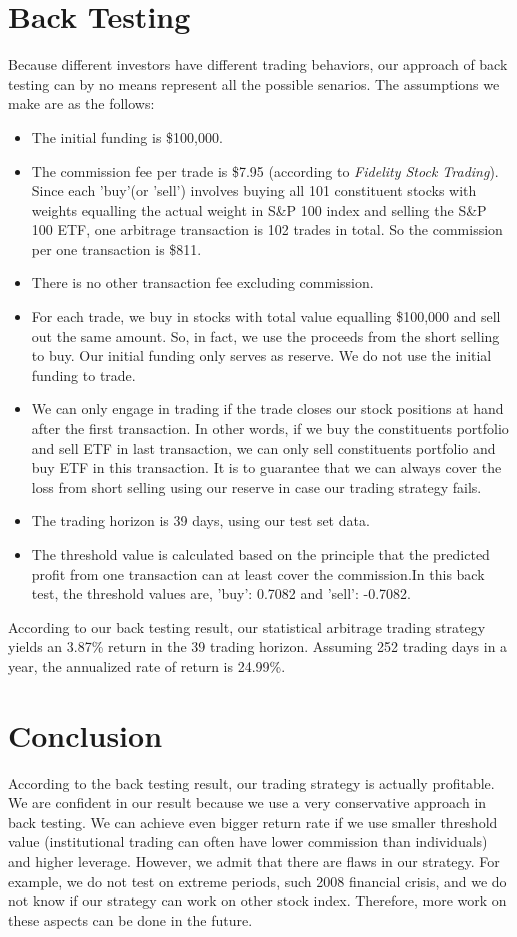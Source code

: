 \documentclass[letterpaper,12pt]{article}
\numberwithin{equation}{section}
\begin{document}
	\section{Back Testing}
	Because different investors have different trading behaviors, our approach of back testing can by no means represent all the possible senarios. The assumptions we make are as the follows:
	\begin{itemize}
		\item The initial funding is \$100,000.
		\item The commission fee per trade is \$7.95 (according to \emph{Fidelity Stock Trading}). Since each 'buy'(or 'sell') involves buying all 101 constituent stocks with weights equalling the actual weight in S\&P 100 index and selling the S\&P 100 ETF, one arbitrage transaction is 102 trades in total. So the commission per one transaction is \$811.
		\item There is no other transaction fee excluding commission.
		\item For each trade, we buy in stocks with total value equalling \$100,000 and sell out the same amount. So, in fact, we use the proceeds from the short selling to buy. Our initial funding only serves as reserve. We do not use the initial funding to trade. 
		\item We can only engage in trading if the trade closes our stock positions at hand after the first transaction. In other words, if we buy the constituents portfolio and sell ETF in last transaction, we can only sell constituents portfolio and buy ETF in this transaction. It is to guarantee that we can always cover the loss from short selling using our reserve in case our trading strategy fails. 
		\item The trading horizon is 39 days, using our test set data.
		\item The threshold value is calculated based on the principle that the predicted profit from one transaction can at least cover the commission.In this back test, the threshold values are, 'buy': 0.7082 and 'sell': -0.7082.  
	\end{itemize}
	
	According to our back testing result, our statistical arbitrage trading strategy yields an 3.87\% return in the 39 trading horizon. Assuming 252 trading days in a year, the annualized rate of return is 24.99\%. 
	
	\section{Conclusion}
	According to the back testing result, our trading strategy is actually profitable. We are confident in our result because we use a very conservative approach in back testing.
	We can achieve even bigger return rate if we use smaller threshold value (institutional trading can often have lower commission than individuals) and higher leverage. However, we admit that there are flaws in our strategy. For example, we do not test on extreme periods, such 2008 financial crisis, and we do not know if our strategy can work on other stock index. Therefore, more work on these aspects can be done in the future. 
	
	
	
	
\end{document}

